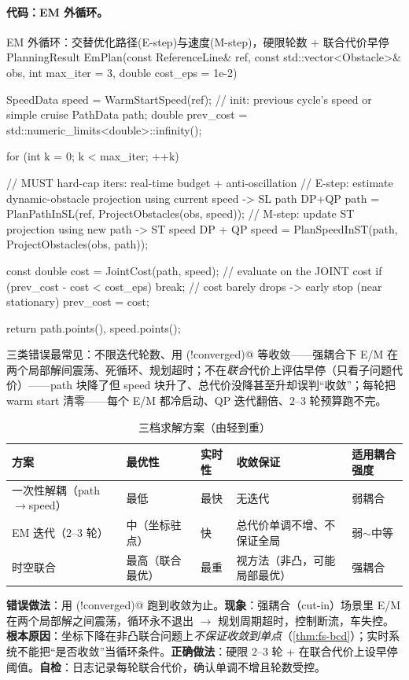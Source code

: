 \paragraph{代码：EM 外循环。}
\begin{codebox}[C++]{EM 外循环：交替优化路径(E-step)与速度(M-step)，硬限轮数 + 联合代价早停}
PlanningResult EmPlan(const ReferenceLine& ref, const std::vector<Obstacle>& obs,
                      int max_iter = 3, double cost_eps = 1e-2) {
  SpeedData speed = WarmStartSpeed(ref);   // init: previous cycle's speed or simple cruise
  PathData  path;
  double prev_cost = std::numeric_limits<double>::infinity();

  for (int k = 0; k < max_iter; ++k) {     // MUST hard-cap iters: real-time budget + anti-oscillation
    // E-step: estimate dynamic-obstacle projection using current speed -> SL path DP+QP
    path  = PlanPathInSL(ref, ProjectObstacles(obs, speed));
    // M-step: update ST projection using new path -> ST speed DP + QP
    speed = PlanSpeedInST(path, ProjectObstacles(obs, path));

    const double cost = JointCost(path, speed);   // evaluate on the JOINT cost
    if (prev_cost - cost < cost_eps) break;       // cost barely drops -> early stop (near stationary)
    prev_cost = cost;
  }
  return {path.points(), speed.points()};
}
\end{codebox}
三类错误最常见：不限迭代轮数、用 \verb@while (!converged)@ 等收敛——强耦合下 E/M 在两个局部解间震荡、死循环、规划超时；不在\emph{联合}代价上评估早停（只看子问题代价）——path 块降了但 speed 块升了、总代价没降甚至升却误判“收敛”；每轮把 warm start 清零——每个 E/M 都冷启动、QP 迭代翻倍、$2$--$3$ 轮预算跑不完。

\begin{table}[H]\centering\small
\caption{三档求解方案（由轻到重）}
\label{tab:fs-three-tier}
\begin{tabular}{lllll}
\toprule
方案 & 最优性 & 实时性 & 收敛保证 & 适用耦合强度 \\
\midrule
一次性解耦（path$\to$speed） & 最低 & 最快 & 无迭代 & 弱耦合 \\
EM 迭代（$2$--$3$ 轮） & 中（坐标驻点） & 快 & 总代价单调不增、不保证全局 & 弱$\sim$中等 \\
时空联合 & 最高（联合最优） & 最重 & 视方法（非凸，可能局部最优） & 强耦合 \\
\bottomrule
\end{tabular}
\end{table}

\begin{pitfall}
\textbf{错误做法}：用 \verb@while (!converged)@ 跑到收敛为止。\textbf{现象}：强耦合（cut-in）场景里 E/M 在两个局部解之间震荡，循环永不退出 $\to$ 规划周期超时，控制断流，车失控。\textbf{根本原因}：坐标下降在非凸联合问题上\emph{不保证收敛到单点}（\cref{thm:fs-bcd}）；实时系统不能把“是否收敛”当循环条件。\textbf{正确做法}：硬限 $2$--$3$ 轮 + 在联合代价上设早停阈值。\textbf{自检}：日志记录每轮联合代价，确认单调不增且轮数受控。
\end{pitfall}

